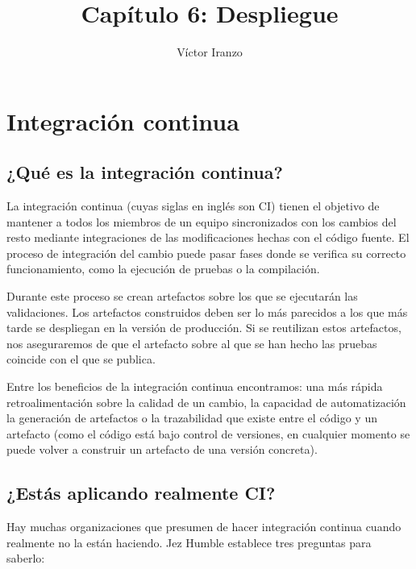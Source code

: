 \documentclass[11pt,a4paper]{article}
\author{Víctor Iranzo}
\title{Capítulo 6: Despliegue}
\begin{document}
\maketitle

\section{Integración continua}

\subsection{¿Qué es la integración continua?}

La integración continua (cuyas siglas en inglés son CI) tienen el objetivo de mantener a todos los miembros de un equipo sincronizados con los cambios del resto mediante integraciones de las modificaciones hechas con el código fuente. El proceso de integración del cambio puede pasar fases donde se verifica su correcto funcionamiento, como la ejecución de pruebas o la compilación. 

Durante este proceso se crean artefactos sobre los que se ejecutarán las validaciones. Los artefactos construidos deben ser lo más parecidos a los que más tarde se despliegan en la versión de producción. Si se reutilizan estos artefactos, nos aseguraremos de que el artefacto sobre al que se han hecho las pruebas coincide con el que se publica.

Entre los beneficios de la integración continua encontramos: una más rápida retroalimentación sobre la calidad de un cambio, la capacidad de automatización la generación de artefactos o la trazabilidad que existe entre el código y un artefacto (como el código está bajo control de versiones, en cualquier momento se puede volver a construir un artefacto de una versión concreta).

\subsection{¿Estás aplicando realmente CI?}

Hay muchas organizaciones que presumen de hacer integración continua cuando realmente no la están haciendo. Jez Humble establece tres preguntas para saberlo:
\end{document}
